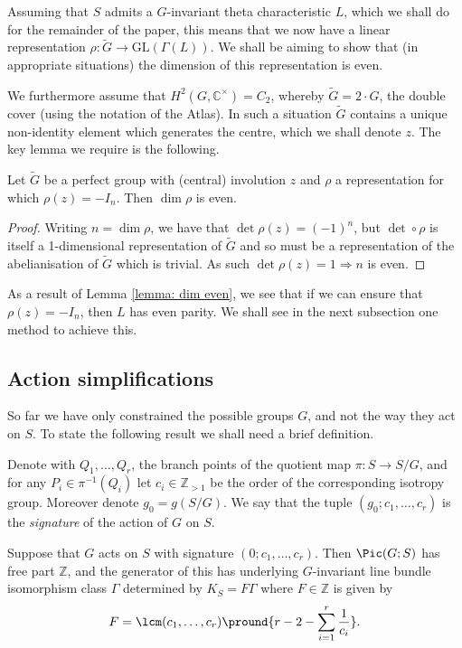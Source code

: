 \documentclass{amsart}
\begin{document}
Assuming that $S$ admits a $G$-invariant theta characteristic $L$, which we shall do for the remainder of the paper, this means that we now have a linear representation $\rho : \tilde{G} \to \mathrm{GL}(\Gamma(L))$. We shall be aiming to show that (in appropriate situations) the dimension of this representation is even. 


We furthermore assume that $H^2(G, \mathbb{C}^\times) = C_2$, whereby $\tilde{G} = 2 \cdot G$, the double cover (using the notation of the Atlas). In such a situation $\tilde{G}$ contains a unique non-identity element which generates the centre, which we shall denote $z$. The key lemma we require is the following. 

\begin{lemma}\label{lemma: dim even}
    Let $\tilde{G}$ be a perfect group with (central) involution $z$ and $\rho$ a representation for which $\rho(z)=-I_n$. Then $\dim \rho$ is even. 
\end{lemma}
\begin{proof}
    Writing $n=\dim \rho$, we have that $\det \rho(z) = (-1)^n$, but $\det \circ \rho$ is itself a 1-dimensional representation of $\tilde{G}$ and so must be a representation of the abelianisation of $\tilde{G}$ which is trivial. As such $\det \rho(z) =1 \Rightarrow n$ is even.
\end{proof}

As a result of Lemma \ref{lemma: dim even}, we see that if we can ensure that $\rho(z)=-I_n$, then $L$ has even parity. We shall see in the next subsection one method to achieve this. 

\subsection{Action simplifications}

So far we have only constrained the possible groups $G$, and not the way they act on $S$. To state the following result we shall need a brief definition. 

\begin{definition}
    Denote with $Q_1, \dots, Q_r$, the branch points of the quotient map $\pi : S \to S/G$, and for any $P_i \in \pi^{-1}(Q_i)$ let $c_i \in \mathbb{Z}_{>1}$ be the order of the corresponding isotropy group. Moreover denote $g_0 = g(S/G)$. We say that the tuple $(g_0; c_1, \dots, c_r)$ is the \textit{signature} of the action of $G$ on $S$.
\end{definition}

\begin{prop}\label{prop: free part}
    Suppose that $G$ acts on $S$ with signature $(0; c_1, \dots, c_r)$. Then $\Pic(G; S)$ has free part $\mathbb{Z}$, and the generator of this has underlying $G$-invariant line bundle isomorphism class $\Gamma$ determined by $K_S = F \Gamma$ where $F \in \mathbb{Z}$ is given by 
    \[
     F= \lcm(c_1, \dots, c_r) \pround{r-2-\sum_{i=1}^r \frac{1}{c_i}}.
    \] 
\end{prop}
\end{document}
